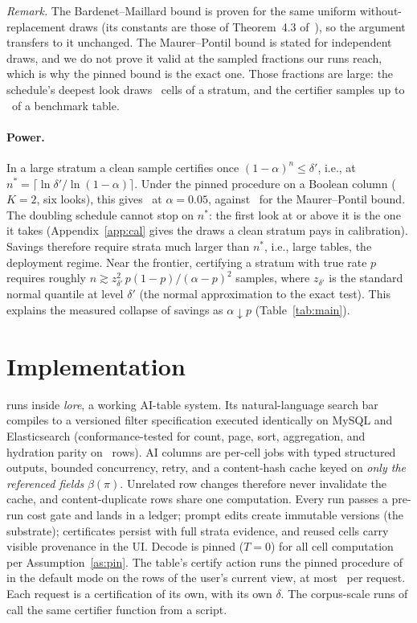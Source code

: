 \noindent\emph{Remark.} The Bardenet--Maillard bound is proven for the
same uniform without-replacement draws (its constants are those of
Theorem~4.3 of~\cite{bardenet}), so the argument transfers to it
unchanged. The Maurer--Pontil bound is stated for independent draws, and
we do not prove it valid at the sampled fractions our runs reach, which
is why the pinned bound is the exact one. Those fractions are large: the
schedule's deepest look draws \deployAugustFiveLook\ cells of a stratum,
and the certifier samples up to \sampleFracHi\ of a benchmark table.

\keeprunin
\paragraph{Power.} In a large stratum a clean sample certifies once
$(1-\alpha)^n \le \delta'$, i.e., at $n^{*} = \lceil \ln \delta' /
\ln(1-\alpha) \rceil$. Under the pinned procedure on a Boolean column
($K{=}2$, six looks), this gives \minZeroFlipSample\ at $\alpha{=}0.05$,
against \minZeroFlipSampleEb\ for the Maurer--Pontil bound. The
doubling schedule cannot stop on $n^{*}$: the first look at or above it
is the one it takes (Appendix~\ref{app:cal} gives the draws a clean
stratum pays in calibration). Savings therefore require strata much
larger than $n^{*}$, i.e., large tables, the deployment regime. Near the frontier, certifying a stratum with true
rate $p$ requires roughly $n \gtrsim z_{\delta'}^2\, p(1-p) /
(\alpha-p)^2$ samples, where $z_{\delta'}$ is the standard normal
quantile at level $\delta'$ (the normal approximation to the exact
test).
This explains the measured collapse of savings as $\alpha \downarrow
p$ (Table~\ref{tab:main}).

\keepheading
\section{Implementation}
\label{sec:impl}

\sivm{} runs inside \emph{lore}, a working AI-table system. Its
natural-language search bar compiles to a
versioned filter specification executed identically on MySQL and
Elasticsearch (conformance-tested for count, page, sort, aggregation,
and hydration parity on \corpusSO\ rows). AI columns are per-cell jobs
with typed structured outputs, bounded concurrency, retry, and a
content-hash cache keyed on \emph{only the referenced fields}
$\beta(\pi)$. Unrelated row changes therefore never invalidate the
cache, and content-duplicate rows share one computation. Every run passes a
pre-run cost gate and lands in a ledger; prompt edits create
immutable versions (the \sivm{} substrate); certificates persist with
full strata evidence, and reused cells carry visible provenance in the
UI. Decode is pinned ($T{=}0$) for all cell computation per
Assumption~\ref{as:pin}. The table's certify action runs the pinned
procedure of  in the default mode on the rows of the
user's current view, at most \routeScopeCap\ per request. Each request
is a certification of its own, with its own $\delta$. The corpus-scale
runs of  call the same certifier function from a
script.

